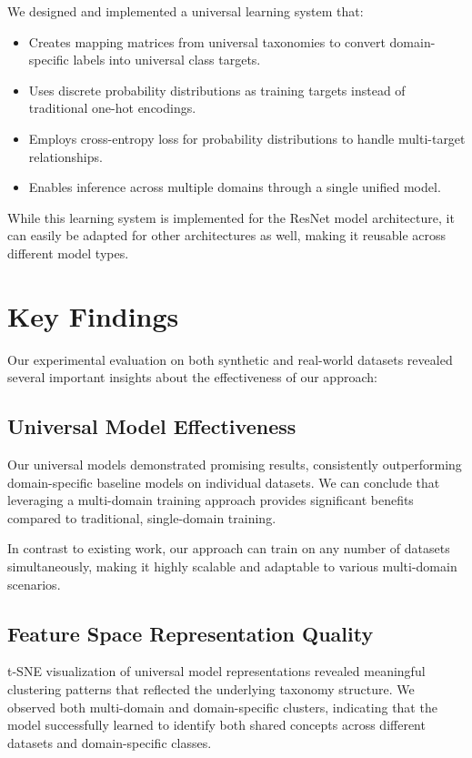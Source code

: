 We designed and implemented a universal learning system that:

\begin{itemize}
    \item Creates mapping matrices from universal taxonomies to convert domain-specific labels
          into universal class targets.
    \item Uses discrete probability distributions as training targets
          instead of traditional one-hot encodings.
    \item Employs cross-entropy loss for probability distributions
          to handle multi-target relationships.
    \item Enables inference across multiple domains through a single unified model.
\end{itemize}

While this learning system is implemented for the ResNet model architecture,
it can easily be adapted for other architectures as well,
making it reusable across different model types.

\section{Key Findings}

Our experimental evaluation on both synthetic and real-world datasets
revealed several important insights about the effectiveness of our approach:

\subsection{Universal Model Effectiveness}

Our universal models demonstrated promising results,
consistently outperforming domain-specific baseline models on individual datasets.
We can conclude that leveraging a multi-domain training approach
provides significant benefits compared to traditional, single-domain training.

In contrast to existing work,
our approach can train on any number of datasets simultaneously,
making it highly scalable and adaptable to various multi-domain scenarios.

\subsection{Feature Space Representation Quality}

t-SNE visualization of universal model representations revealed
meaningful clustering patterns that reflected the underlying taxonomy structure.
We observed both multi-domain and domain-specific clusters,
indicating that the model successfully learned to identify both shared concepts
across different datasets and domain-specific classes.

